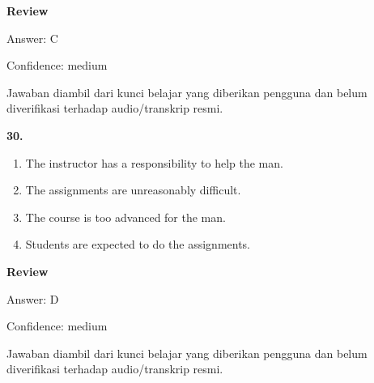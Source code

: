 \documentclass[12pt]{article}
\begin{document}
\begingroup
\setlength{\parskip}{0pt}
\setlength{\parindent}{0pt}
\textbf{Review}\par
Answer: C\par
Confidence: medium\par
Jawaban diambil dari kunci belajar yang diberikan pengguna dan belum diverifikasi terhadap audio/transkrip resmi.\par
\endgroup
\par
\vspace{0.25\baselineskip}
\noindent\textbf{30.}
\begin{enumerate}[label=(\Alph*),leftmargin=*,itemsep=0.2em]
\item The instructor has a responsibility to help the man.
\item The assignments are unreasonably difficult.
\item The course is too advanced for the man.
\item Students are expected to do the assignments.
\end{enumerate}
\par
\begingroup
\setlength{\parskip}{0pt}
\setlength{\parindent}{0pt}
\textbf{Review}\par
Answer: D\par
Confidence: medium\par
Jawaban diambil dari kunci belajar yang diberikan pengguna dan belum diverifikasi terhadap audio/transkrip resmi.\par
\endgroup
\par
\vspace{0.25\baselineskip}
\end{document}
